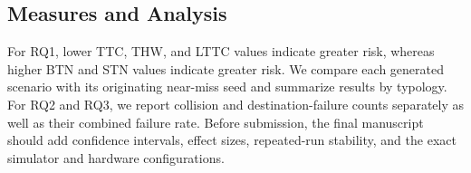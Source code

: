 \subsection{Measures and Analysis}

For RQ1, lower TTC, THW, and LTTC values indicate greater risk, whereas higher BTN and STN values indicate greater risk. We compare each generated scenario with its originating near-miss seed and summarize results by typology. For RQ2 and RQ3, we report collision and destination-failure counts separately as well as their combined failure rate. Before submission, the final manuscript should add confidence intervals, effect sizes, repeated-run stability, and the exact simulator and hardware configurations.

